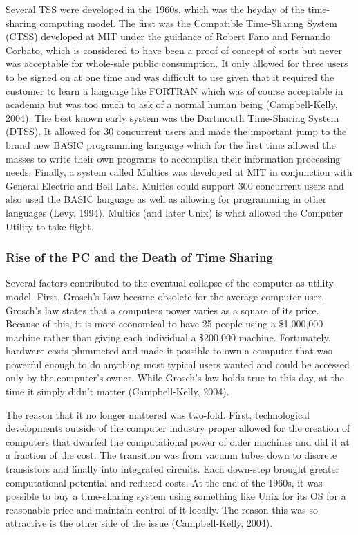 \documentclass[12pt,oneside,letterpaper]{article}
\begin{document}
Several TSS were developed in the 1960s, which was the heyday of the
time-sharing computing model.  The first was the Compatible Time-Sharing System
(CTSS) developed at MIT under the guidance of Robert Fano and Fernando Corbato,
which is considered to have been a proof of concept of sorts but never was
acceptable for whole-sale public consumption.  It only allowed for three users
to be signed on at one time and was difficult to use given that it required the
customer to learn a language like FORTRAN which was of course acceptable in
academia but was too much to ask of a normal human being (Campbell-Kelly, 2004).
The best known early system was the Dartmouth Time-Sharing System (DTSS).  It
allowed for 30 concurrent users and made the important jump to the brand new
BASIC programming language which for the first time allowed the masses to write
their own programs to accomplish their information processing needs.  Finally, a
system called Multics was developed at MIT in conjunction with General Electric
and Bell Labs.  Multics could support 300 concurrent users and also used the
BASIC language as well as allowing for programming in other languages (Levy,
1994).  Multics (and later Unix) is what allowed the Computer Utility to take
flight.

\subsubsection{Rise of the PC and the Death of Time Sharing}

Several factors contributed to the eventual collapse of the computer-as-utility
model.  First, Grosch's Law became obsolete for the average computer user.
Grosch's law states that a computers power varies as a square of its price.
Because of this, it is more economical to have 25 people using a \$1,000,000
machine rather than giving each individual a \$200,000 machine.  Fortunately,
hardware costs plummeted and made it possible to own a computer that was
powerful enough to do anything most typical users wanted and could be accessed
only by the computer's owner.  While Grosch's law holds true to this day, at the
time it simply didn't matter (Campbell-Kelly, 2004).

The reason that it no longer mattered was two-fold.  First, technological
developments outside of the computer industry proper allowed for the creation of
computers that dwarfed the computational power of older machines and did it at a
fraction of the cost.  The transition was from vacuum tubes down to discrete
transistors and finally into integrated circuits.  Each down-step brought
greater computational potential and reduced costs.  At the end of the 1960s, it
was possible to buy a time-sharing system using something like Unix for its OS
for a reasonable price and maintain control of it locally.  The reason this was
so attractive is the other side of the issue (Campbell-Kelly, 2004).
\end{document}
